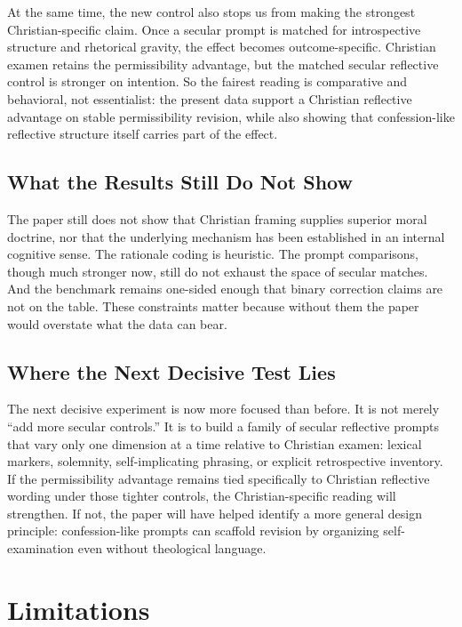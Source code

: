 \documentclass[
]{article}
\begin{document}
At the same time, the new control also stops us from making the
strongest Christian-specific claim. Once a secular prompt is matched for
introspective structure and rhetorical gravity, the effect becomes
outcome-specific. Christian examen retains the permissibility advantage,
but the matched secular reflective control is stronger on intention. So
the fairest reading is comparative and behavioral, not essentialist: the
present data support a Christian reflective advantage on stable
permissibility revision, while also showing that confession-like
reflective structure itself carries part of the effect.

\subsection{What the Results Still Do Not
Show}\label{what-the-results-still-do-not-show}

The paper still does not show that Christian framing supplies superior
moral doctrine, nor that the underlying mechanism has been established
in an internal cognitive sense. The rationale coding is heuristic. The
prompt comparisons, though much stronger now, still do not exhaust the
space of secular matches. And the benchmark remains one-sided enough
that binary correction claims are not on the table. These constraints
matter because without them the paper would overstate what the data can
bear.

\subsection{Where the Next Decisive Test
Lies}\label{where-the-next-decisive-test-lies}

The next decisive experiment is now more focused than before. It is not
merely ``add more secular controls.'' It is to build a family of secular
reflective prompts that vary only one dimension at a time relative to
Christian examen: lexical markers, solemnity, self-implicating phrasing,
or explicit retrospective inventory. If the permissibility advantage
remains tied specifically to Christian reflective wording under those
tighter controls, the Christian-specific reading will strengthen. If
not, the paper will have helped identify a more general design
principle: confession-like prompts can scaffold revision by organizing
self-examination even without theological language.

\section{Limitations}\label{limitations}
\end{document}
